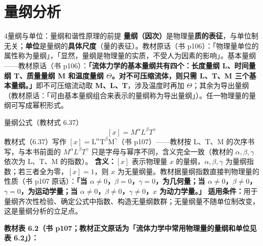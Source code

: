\section{量纲分析}

\begin{kaodian}{4}{量纲与单位：量纲和谐性原理的前提}
\textbf{量纲（因次）}是物理量\textbf{质的表征}，与单位制无关；\textbf{单位}是量纲的\textbf{具体尺度}（量的表征）。教材原话（书 p106）：「物理量单位的属性称为量纲」，「显然，量纲是物理量的实质，不受人为因素的影响」。基本量纲——教材原话（书 p106）：\textbf{「流体力学的基本量纲共有四个：长度量纲 L、时间量纲 T、质量量纲 M 和温度量纲 $\Theta$。对不可压缩流体，则只需 L、T、M 三个基本量纲。」}即不可压缩流动取 \textbf{M、L、T}，涉及温度时再加 \textbf{$\Theta$}；其余为导出量纲（教材原话：「可由基本量纲组合来表示的量纲称为导出量纲」）。任一物理量的量纲可写成幂积形式。

\begin{gongshi}{量纲公式（教材式 6.37）}
\[ [x]=M^{\alpha}L^{\beta}T^{\gamma} \]
教材式（6.37）写作 $[x]=\mathrm{L}^{\alpha}\mathrm{T}^{\beta}\mathrm{M}^{\gamma}$（书 p107）——教材按 L、T、M 的次序书写，与本书前面的 $M^{\alpha}L^{\beta}T^{\gamma}$ 只是字母与幂序不同，含义完全一致（教材的 $\alpha,\beta,\gamma$ 依次为 L、T、M 的指数）。
\textbf{含义：}$[x]$ 表示物理量 $x$ 的量纲，$\alpha,\beta,\gamma$ 为量纲指数；若三者全为零，$[x]=1$，则 $x$ 为无量纲量。教材据量纲指数直接判物理量的性质（书 p107 原话）：\textbf{「当 $\alpha\ne 0$，$\beta=0$，$\gamma=0$，为几何量；当 $\alpha\ne 0$，$\beta\ne 0$，$\gamma=0$，为运动学量；当 $\alpha\ne 0$，$\beta\ne 0$，$\gamma\ne 0$，$x$ 为动力学量。」}
\textbf{适用条件：}用于量纲齐次性检验、确定公式中指数、构造无量纲数群；无量纲量不随单位制改变，这是量纲分析的立足点。
\end{gongshi}

\textbf{教材表 6.2（书 p107；教材正文原话为「流体力学中常用物理量的量纲和单位见表 6.2」）：}


\end{kaodian}
